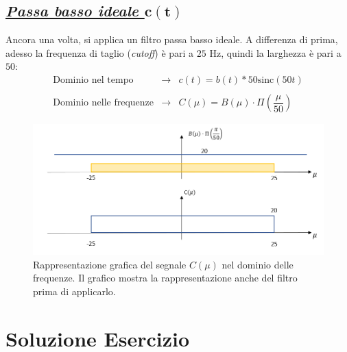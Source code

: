 \documentclass[a4paper]{article}
\begin{document}
	\subsection*{\textcolor{Green4}{\underline{\textbf{\emph{Passa basso ideale $\boldsymbol{c\left(t\right)}$}}}}}
	
	Ancora una volta, si applica un filtro passa basso ideale. A differenza di prima, adesso la frequenza di taglio (\emph{cutoff}) è pari a $25$ Hz, quindi la larghezza è pari a $50$:
	\begin{equation*}
		\begin{array}{lll}
			\text{Dominio nel tempo} & \longrightarrow & c\left(t\right) = b\left(t\right) * 50\mathrm{sinc}\left(50t\right) \\
			\\
			\text{Dominio nelle frequenze} & \longrightarrow & C\left(\mu\right) = B\left(\mu\right) \cdot \Pi\left(\dfrac{\mu}{50}\right)
		\end{array}
	\end{equation*}
	\begin{figure}[!htp]
		\centering
		\includegraphics[width=\textwidth]{img/fig_9.png}
		\caption*{Rappresentazione grafica del segnale $C\left(\mu\right)$ nel dominio delle frequenze. Il grafico mostra la rappresentazione anche del filtro prima di applicarlo.}
	\end{figure}\newpage

	\section{Soluzione Esercizio}
	
\end{document}
